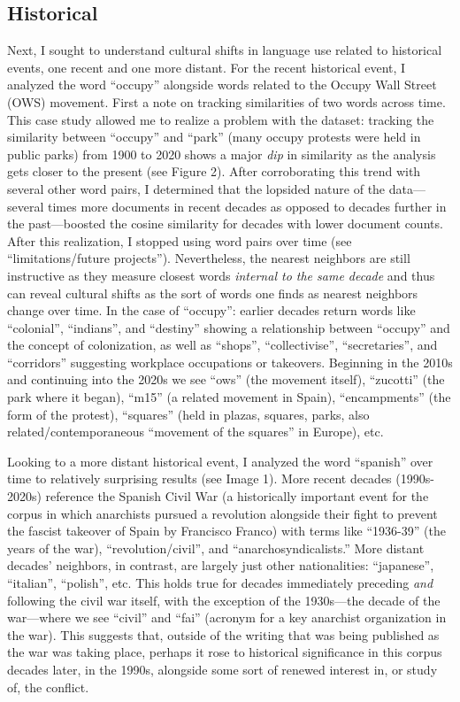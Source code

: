 \documentclass[11pt]{article}
\begin{document}
\subsection{Historical}

Next, I sought to understand cultural shifts in language use related to historical events, one recent and one more distant. For the recent historical event, I analyzed the word “occupy” alongside words related to the Occupy Wall Street (OWS) movement. First a note on tracking similarities of two words across time. This case study allowed me to realize a problem with the dataset: tracking the similarity between “occupy” and “park” (many occupy protests were held in public parks) from 1900 to 2020 shows a major \textit{dip} in similarity as the analysis gets closer to the present (see Figure 2). After corroborating this trend with several other word pairs, I determined that the lopsided nature of the data—several times more documents in recent decades as opposed to decades further in the past—boosted the cosine similarity for decades with lower document counts. After this realization, I stopped using word pairs over time (see “limitations/future projects”). Nevertheless, the nearest neighbors are still instructive as they measure closest words \textit{internal to the same decade} and thus can reveal cultural shifts as the sort of words one finds as nearest neighbors change over time. In the case of “occupy”: earlier decades return words like “colonial”, “indians”, and “destiny” showing a relationship between “occupy” and the concept of colonization, as well as “shops”, “collectivise”, “secretaries”, and “corridors” suggesting workplace occupations or takeovers. Beginning in the 2010s and continuing into the 2020s we see “ows” (the movement itself), “zucotti” (the park where it began), “m15” (a related movement in Spain), “encampments” (the form of the protest), “squares” (held in plazas, squares, parks, also related/contemporaneous “movement of the squares” in Europe), etc. 

Looking to a more distant historical event, I analyzed the word “spanish” over time to relatively surprising results (see Image 1). More recent decades (1990s-2020s) reference the Spanish Civil War (a historically important event for the corpus in which anarchists pursued a revolution alongside their fight to prevent the fascist takeover of Spain by Francisco Franco) with terms like “1936-39” (the years of the war), “revolution/civil”, and “anarchosyndicalists.” More distant decades’ neighbors, in contrast, are largely just other nationalities: “japanese”, “italian”, “polish”, etc. This holds true for decades immediately preceding \textit{and }following the civil war itself, with the exception of the 1930s—the decade of the war—where we see “civil” and “fai” (acronym for a key anarchist organization in the war). This suggests that, outside of the writing that was being published as the war was taking place, perhaps it rose to historical significance in this corpus decades later, in the 1990s, alongside some sort of renewed interest in, or study of, the conflict.
\end{document}
